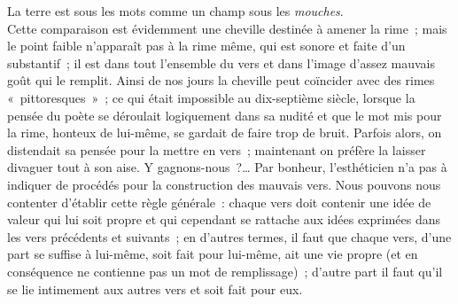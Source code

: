 \documentclass[french,twoside]{book} %
\begin{document}
La terre est sous les mots comme un champ sous les \emph{mouches}.\\

\noindent Cette comparaison est évidemment une cheville destinée à amener la rime ; mais le point faible n’apparaît pas à la rime même, qui est sonore et faite d’un substantif ; il est dans tout l’ensemble du vers et dans l’image d’assez mauvais goût qui le remplit. Ainsi de nos jours la cheville peut coïncider avec des rimes « pittoresques » ; ce qui était impossible au dix-septième siècle, lorsque la pensée du poète se déroulait logiquement dans sa nudité et que le mot mis pour la rime, honteux de lui-même, se gardait de faire trop de bruit. Parfois alors, on distendait sa pensée pour la mettre en vers ; maintenant on préfère la laisser  divaguer tout à son aise. Y gagnons-nous ?… Par bonheur, l’esthéticien n’a pas à indiquer de procédés pour la construction des mauvais vers. Nous pouvons nous contenter d’établir cette règle générale : chaque vers doit contenir une idée de valeur qui lui soit propre et qui cependant se rattache aux idées exprimées dans les vers précédents et suivants ; en d’autres termes, il faut que chaque vers, d’une part se suffise à lui-même, soit fait pour lui-même, ait une vie propre (et en conséquence ne contienne pas un mot de remplissage) ; d’autre part il faut qu’il se lie intimement aux autres vers et soit fait pour eux.\par
\end{document}
